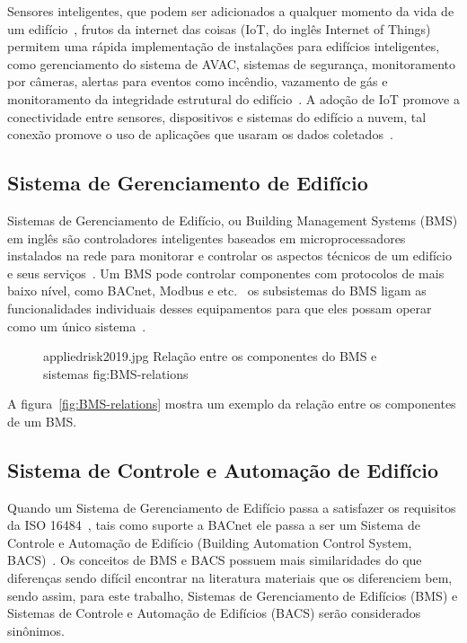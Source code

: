 Sensores inteligentes, que podem ser adicionados a qualquer momento da vida de um edifício~\cite{Kamal2021}, frutos da internet das coisas 
(IoT, do inglês Internet of Things) permitem uma rápida implementação de instalações para edifícios inteligentes, como gerenciamento do sistema de AVAC, 
sistemas de segurança, monitoramento por câmeras, alertas para eventos como incêndio, vazamento de gás e monitoramento da integridade estrutural 
do edifício~\cite{Bellini2022}. A adoção de IoT promove a conectividade entre sensores, dispositivos e sistemas do edifício a nuvem, 
tal conexão promove o uso de aplicações que usaram os dados coletados~\cite{Berkoben2020}.

\subsection{Sistema de Gerenciamento de Edifício}
Sistemas de Gerenciamento de Edifício, ou Building Management Systems (BMS) em inglês são controladores inteligentes baseados em 
microprocessadores instalados na rede para monitorar e controlar os aspectos técnicos de um edifício e seus serviços~\cite{appliedrisk2019}. 
Um BMS pode controlar componentes com protocolos de mais baixo nível, como BACnet, Modbus e etc.~\cite{Berkoben2020} os subsistemas do BMS 
ligam as funcionalidades individuais desses equipamentos para que eles possam operar como um único sistema~\cite{appliedrisk2019}.
\begin{figure}[H]
    {appliedrisk2019.jpg}                 %
    {Relação entre os componentes do BMS e sistemas}     %
    {fig:BMS-relations}                      %
\end{figure}
A figura~\ref{fig:BMS-relations} mostra um exemplo da relação entre os componentes de um BMS.\@
 
\subsection{Sistema de Controle e Automação de Edifício}
Quando um Sistema de Gerenciamento de Edifício passa a satisfazer os requisitos da ISO 16484~\cite{ISO16484}, tais como suporte a BACnet ele 
passa a ser um Sistema de Controle e Automação de Edifício (Building Automation Control System, BACS)~\cite{docsuspeito2006}. 
Os conceitos de BMS e BACS possuem mais similaridades do que diferenças sendo difícil encontrar na literatura materiais que os diferenciem bem, 
sendo assim, para este trabalho, Sistemas de Gerenciamento de Edifícios (BMS) e Sistemas de Controle e Automação de Edifícios (BACS) serão considerados sinônimos.

